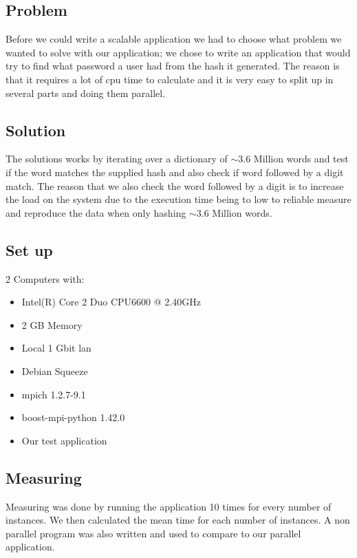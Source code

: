 \documentclass{article}
\begin{document}
{\subsection{Problem}
Before we could write a scalable application we had to choose what problem we
wanted to solve with our application; we chose to write an application that
would try to find what password a user had from the hash it generated.
The reason is that it requires a lot of cpu time to calculate and it is 
very easy to split up in several parts and doing them parallel.

\subsection{Solution}
The solutions works by iterating over a dictionary of $\sim$3.6 Million words
and test if the word matches the supplied hash and also check if word followed
by a digit match. The reason that we also check the word followed by a digit
is to increase the load on the system due to the execution time being to 
low to reliable measure and reproduce the data when only hashing $\sim$3.6
Million words.

\subsection{Set up}
2 Computers with:
\begin{itemize}
\item Intel(R) Core 2 Duo CPU6600  @ 2.40GHz
\item 2 GB Memory
\item Local 1 Gbit lan
\item Debian Squeeze
\item mpich 1.2.7-9.1
\item boost-mpi-python 1.42.0
\item Our test application \cite{pympi-test}
\end{itemize}

\subsection{Measuring}
Measuring was done by running the application 10 times for every number of
instances. We then calculated the mean time for each number of instances. A non
parallel program was also written and used to compare to our parallel
application.

}
\end{document}
